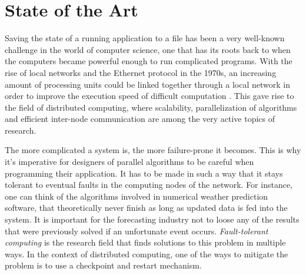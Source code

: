 {
\setlength{\parindent}{2em}
\chapter{State of the Art}\label{cha:state-of-the-art}
Saving the state of a running application to a file has been a very well-known challenge in the world of computer science, one that has its roots back to when the computers became powerful enough to run complicated programs. With the rise of local networks and the Ethernet protocol in the 1970s, an increasing amount of processing units could be linked together through a local network in order to improve the execution speed of difficult computation \cite{book:andrews}. This gave rise to the field of distributed computing, where scalability, parallelization of algorithms and efficient inter-node communication are among the very active topics of research.

The more complicated a system is, the more failure-prone it becomes. This is why it's imperative for designers of parallel algorithms to be careful when programming their application. It has to be made in such a way that it stays tolerant to eventual faults in the computing nodes of the network. For instance, one can think of the algorithms involved in numerical weather prediction software, that theoretically never finish as long as updated data is fed into the system. It is important for the forecasting industry not to loose any of the results that were previously solved if an unfortunate event occurs. \textit{Fault-tolerant computing} is the research field that finds solutions to this problem in multiple ways. In the context of distributed computing, one of the ways to mitigate the problem is to use a checkpoint and restart mechanism.

}
